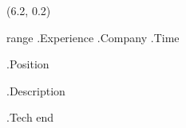 \begin{textblock}{15}(6.2, 0.2)

{{range .Experience}}
    {{.Company}} {{.Time}}

    {{.Position}}

    {{.Description}}

    {{.Tech}}
{{end}}


\end{textblock}